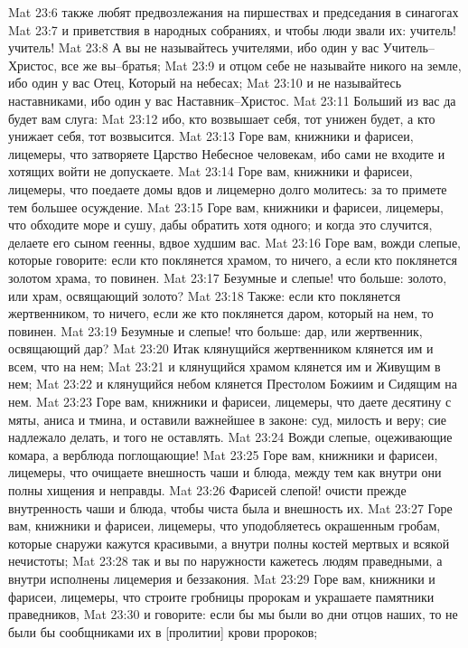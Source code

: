 Mat 23:6  также любят предвозлежания на пиршествах и председания в синагогах
Mat 23:7  и приветствия в народных собраниях, и чтобы люди звали их: учитель! учитель!
Mat 23:8  А вы не называйтесь учителями, ибо один у вас Учитель--Христос, все же вы--братья;
Mat 23:9  и отцом себе не называйте никого на земле, ибо один у вас Отец, Который на небесах;
Mat 23:10  и не называйтесь наставниками, ибо один у вас Наставник--Христос.
Mat 23:11  Больший из вас да будет вам слуга:
Mat 23:12  ибо, кто возвышает себя, тот унижен будет, а кто унижает себя, тот возвысится.
Mat 23:13  Горе вам, книжники и фарисеи, лицемеры, что затворяете Царство Небесное человекам, ибо сами не входите и хотящих войти не допускаете.
Mat 23:14  Горе вам, книжники и фарисеи, лицемеры, что поедаете домы вдов и лицемерно долго молитесь: за то примете тем большее осуждение.
Mat 23:15  Горе вам, книжники и фарисеи, лицемеры, что обходите море и сушу, дабы обратить хотя одного; и когда это случится, делаете его сыном геенны, вдвое худшим вас.
Mat 23:16  Горе вам, вожди слепые, которые говорите: если кто поклянется храмом, то ничего, а если кто поклянется золотом храма, то повинен.
Mat 23:17  Безумные и слепые! что больше: золото, или храм, освящающий золото?
Mat 23:18  Также: если кто поклянется жертвенником, то ничего, если же кто поклянется даром, который на нем, то повинен.
Mat 23:19  Безумные и слепые! что больше: дар, или жертвенник, освящающий дар?
Mat 23:20  Итак клянущийся жертвенником клянется им и всем, что на нем;
Mat 23:21  и клянущийся храмом клянется им и Живущим в нем;
Mat 23:22  и клянущийся небом клянется Престолом Божиим и Сидящим на нем.
Mat 23:23  Горе вам, книжники и фарисеи, лицемеры, что даете десятину с мяты, аниса и тмина, и оставили важнейшее в законе: суд, милость и веру; сие надлежало делать, и того не оставлять.
Mat 23:24  Вожди слепые, оцеживающие комара, а верблюда поглощающие!
Mat 23:25  Горе вам, книжники и фарисеи, лицемеры, что очищаете внешность чаши и блюда, между тем как внутри они полны хищения и неправды.
Mat 23:26  Фарисей слепой! очисти прежде внутренность чаши и блюда, чтобы чиста была и внешность их.
Mat 23:27  Горе вам, книжники и фарисеи, лицемеры, что уподобляетесь окрашенным гробам, которые снаружи кажутся красивыми, а внутри полны костей мертвых и всякой нечистоты;
Mat 23:28  так и вы по наружности кажетесь людям праведными, а внутри исполнены лицемерия и беззакония.
Mat 23:29  Горе вам, книжники и фарисеи, лицемеры, что строите гробницы пророкам и украшаете памятники праведников,
Mat 23:30  и говорите: если бы мы были во дни отцов наших, то не были бы сообщниками их в [пролитии] крови пророков;
